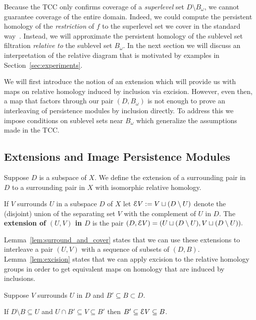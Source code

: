 
Because the TCC only confirms coverage of a \emph{superlevel} set $D\setminus B_\omega$, we cannot guarantee coverage of the entire domain.
Indeed, we could compute the persistent homology of the \emph{restriction} of $f$ to the superlevel set we cover in the standard way~\cite{chazal09analysis}.
Instead, we will approximate the persistent homology of the sublevel set filtration \emph{relative to} the sublevel set $B_\omega$.
In the next section we will discuss an interpretation of the relative diagram that is motivated by examples in Section~\ref{sec:experiments}.

We will first introduce the notion of an extension which will provide us with maps on relative homology induced by inclusion via excision.
However, even then, a map that factors through our pair $(D, B_\omega)$ is not enough to prove an interleaving of persistence modules by inclusion directly.
To address this we impose conditions on sublevel sets near $B_\omega$ which generalize the assumptions made in the TCC.

\subsection{Extensions and Image Persistence Modules}

Suppose $D$ is a subspace of $X$.
We define the extension of a surrounding pair in $D$ to a surrounding pair in $X$ with isomorphic relative homology.

\begin{definition}[Extension]
  If $V$ surrounds $U$ in a subspace $D$ of $X$ let $\mathcal{E} V := V\sqcup (D\setminus U)$ denote the (disjoint) union of the separating set $V$ with the complement of $U$ in $D$.
  The \textbf{extension of $(U, V)$ in $D$} is the pair $(D, \mathcal{E} V) = (U\sqcup (D\setminus U), V\sqcup (D\setminus U)).$
\end{definition}

Lemma~\ref{lem:surround_and_cover} states that we can use these extensions to interleave a pair $(U, V)$ with a sequence of subsets of $(D, B)$.
Lemma~\ref{lem:excision} states that we can apply excision to the relative homology groups in order to get equivalent maps on homology that are induced by inclusions.

\begin{lemma}\label{lem:surround_and_cover}
  Suppose $V$ surrounds $U$ in $D$ and $B'\subseteq B\subset D$.

  If $D\setminus B\subseteq U$ and $U\cap B'\subseteq V\subseteq B'$ then $B'\subseteq \mathcal{E} V\subseteq B$.
\end{lemma}


